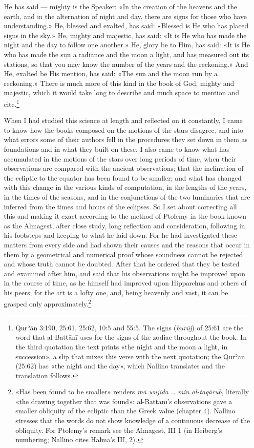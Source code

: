 \documentclass[11pt]{article}
\newcommand{\ArPage}[1]{\marginpar{\footnotesize\color{gray}Ar.\,p.\,#1}}
\begin{document}
\par \ArPage{7}He has said — mighty is the Speaker: «In the creation of the heavens and the earth, and in the alternation of night and day, there are signs for those who have understanding.» He, blessed and exalted, has said: «Blessed is He who has placed signs in the sky.» He, mighty and majestic, has said: «It is He who has made the night and the day to follow one another.» He, glory be to Him, has said: «It is He who has made the sun a radiance and the moon a light, and has measured out its stations, so that you may know the number of the years and the reckoning.» And He, exalted be His mention, has said: «The sun and the moon run by a reckoning.» There is much more of this kind in the book of God, mighty and majestic, which it would take long to describe and much space to mention and cite.\footnote{Qurʾān 3:190, 25:61, 25:62, 10:5 and 55:5. The signs (\emph{burūj}) of 25:61 are the word that al-Battānī uses for the signs of the zodiac throughout the book. In the third quotation the text prints «the night and the moon a light, in succession», a slip that mixes this verse with the next quotation; the Qurʾān (25:62) has «the night and the day», which Nallino translates and the translation follows.}\par
\par When I had studied this science at length and reflected on it constantly, I came to know how the books composed on the motions of the stars disagree, and into what errors some of their authors fell in the procedures they set down in them as foundations and in what they built on these. I also came to know what has accumulated in the motions of the stars over long periods of time, when their observations are compared with the ancient observations; that the inclination of the ecliptic to the equator has been found to be smaller; and what has changed with this change in the various kinds of computation, in the lengths of the years, in the times of the seasons, and in the conjunctions of the two luminaries that are inferred from the times and hours of the eclipses. So I set about correcting all this and making it exact according to the method of Ptolemy in the book known as the Almagest, after close study, long reflection and consideration, following in his footsteps and keeping to what he laid down. For he had investigated these matters from every side and had shown their causes and the reasons that occur in them by a geometrical and numerical proof whose soundness cannot be rejected and whose truth cannot be doubted. After that he ordered that they be tested and examined after him, and said that his observations might be improved upon in the course of time, as he himself had improved upon Hipparchus and others of his peers; for the art is a lofty one, and, being heavenly and vast, it can be grasped only approximately.\footnote{«Has been found to be smaller» renders \emph{mā wujida … min al-taqārub}, literally «the drawing together that was found»: al-Battānī's observations gave a smaller obliquity of the ecliptic than the Greek value (chapter 4). Nallino stresses that the words do not show knowledge of a continuous decrease of the obliquity. For Ptolemy's remark see the Almagest, III 1 (in Heiberg's numbering; Nallino cites Halma's III, 2).}\par
\end{document}
